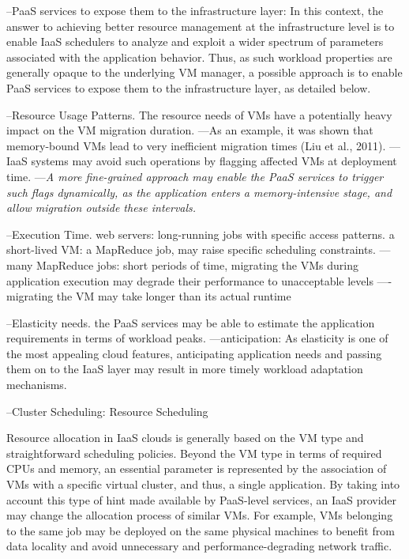 --PaaS services to expose them to the infrastructure layer: In this context, the answer to achieving better resource management at the infrastructure level is to enable IaaS schedulers to analyze and exploit a wider spectrum of parameters associated with the application behavior. Thus, as such workload properties are generally opaque to the underlying VM manager, a possible approach is to enable PaaS services to expose them to the infrastructure layer, as detailed below.

--Resource Usage Patterns. The resource needs of VMs have a potentially heavy impact on the VM migration duration. 
---As an example, it was shown that memory-bound VMs lead to very inefficient migration times (Liu et al., 2011).
---IaaS systems may avoid such operations by flagging affected VMs at deployment time. 
---\textit{A more fine-grained approach may enable the PaaS services to trigger such flags dynamically, as the application enters a memory-intensive stage, and allow migration outside these intervals.}

--Execution Time. web servers: long-running jobs with specific access patterns. a short-lived VM: a MapReduce job, may raise specific scheduling constraints. 
---many MapReduce jobs: short periods of time, migrating the VMs during application execution may degrade their performance to unacceptable levels
----migrating the VM may take longer than its actual runtime

--Elasticity needs. the PaaS services may be able to estimate the application requirements in terms of workload peaks.
---anticipation: As elasticity is one of the most appealing cloud features, anticipating application needs and passing them on to the IaaS layer may result in more timely workload adaptation mechanisms.

--Cluster Scheduling: Resource Scheduling

Resource allocation in IaaS clouds is generally based on the VM type and straightforward scheduling policies. Beyond the VM type in terms of required CPUs and memory, an essential parameter is represented by the association of VMs with a specific virtual cluster, and thus, a single application. By taking into account this type of hint made available by PaaS-level services, an IaaS provider may change the allocation process of similar VMs. For example, VMs belonging to the same job may be deployed on the same physical machines to benefit from data locality and avoid unnecessary and performance-degrading network traffic.

